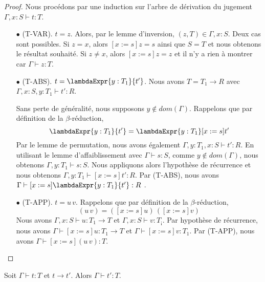 \begin{proof}
  \label{proof:simply-typed-lambda-calculus-preservation-substitution}
  Nous procédons par une induction sur l'arbre de dérivation du jugement $\Gamma, x : S
  \vdash t : T$.

  \begin{itemize}
  \item[$\bullet$] (T-VAR). $t = z$. Alors, par le lemme d'inversion, $(z, T) \in \Gamma, x : S$.
    Deux cas sont possibles. Si $z = x$, alors $[x := s] z = s$ ainsi que
    $S = T$ et nous obtenons le résultat souhaité. Si $z \neq x$,
    alors $[x := s] z = z$ et il n'y a rien à montrer car $\Gamma
    \vdash z : T$.
  \item[$\bullet$] (T-ABS). $t = \lambdaExpr{y : T_{1}}{t'}$.
    Nous avons $T = T_{1} \rightarrow R$ avec
    $\Gamma, x : S, y : T_{1} \vdash t' : R$. 

    Sans perte de généralité, nous supposons $y \notin dom(\Gamma)$.
    Rappelons que par définition de la $\beta$-réduction,
    \begin{equation*}
      [x := s]\lambdaExpr{y : T_{1}}{t'} = \lambdaExpr{y : T_{1}}[x := s] t'
    \end{equation*}
    Par le lemme de permutation,
    nous avons également $\Gamma, y : T_{1}, x : S \vdash t' : R$. En utilisant le lemme
    d'affaiblissement avec $\Gamma \vdash s : S$, comme $y \notin dom(\Gamma)$,
    nous obtenons $\Gamma, y : T_{1} \vdash s : S$.
    Nous appliquons alors l'hypothèse de récurrence et nous obtenons
    $\Gamma, y : T_{1} \vdash [x := s] t' : R$. Par (T-ABS), nous avons
    $\Gamma \vdash [x := s] \lambdaExpr{y : T_{1}}{t'} : R$ .

    \item[$\bullet$] (T-APP). $t = u \, v$.
      Rappelons que par définition de la $\beta$-réduction,
      \begin{equation*}
        [x := s](u \, v) = ([x := s] u) \, ([x := s] v)
      \end{equation*}
      Nous avons $\Gamma, x : S
      \vdash u : T_{1} \rightarrow T$ et $\Gamma, x : S \vdash v : T_{¡}$. Par
      hypothèse de récurrence, nous avons $\Gamma \vdash [x := s]u :
      T_{1} \rightarrow T$ et
      $\Gamma \vdash [x := s]v : T_{1}$. Par (T-APP), nous avons
      $\Gamma \vdash [x := s](u \, v) : T$.
  \end{itemize}
  
\end{proof}

\begin{theorem} 
  \label{thm:simply-typed-lambda-calculus-preservation}
  Soit $\Gamma \vdash t : T$ et $t \rightarrow t'$. Alors $\Gamma \vdash t' :
  T$.
\end{theorem}

